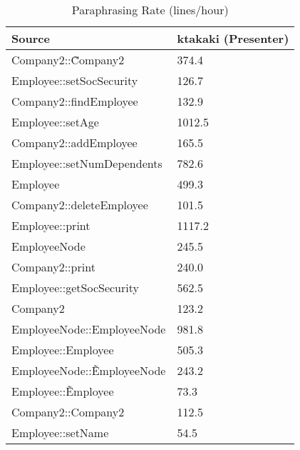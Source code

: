 \begin{table}[hb]
\begin{center}
\begin{tabular}{|l|l|}
\hline
Source & ktakaki (Presenter)\\
\hline
Company2::\~Company2 & 374.4\\
Employee::setSocSecurity & 126.7\\
Company2::findEmployee & 132.9\\
Employee::setAge & 1012.5\\
Company2::addEmployee & 165.5\\
Employee::setNumDependents & 782.6\\
Employee & 499.3\\
Company2::deleteEmployee & 101.5\\
Employee::print & 1117.2\\
EmployeeNode & 245.5\\
Company2::print & 240.0\\
Employee::getSocSecurity & 562.5\\
Company2 & 123.2\\
EmployeeNode::EmployeeNode & 981.8\\
Employee::Employee & 505.3\\
EmployeeNode::\~EmployeeNode & 243.2\\
Employee::\~Employee & 73.3\\
Company2::Company2 & 112.5\\
Employee::setName & 54.5\\
\hline
\end{tabular}
\end{center}
\caption{Paraphrasing Rate (lines/hour)}
\end{table}


